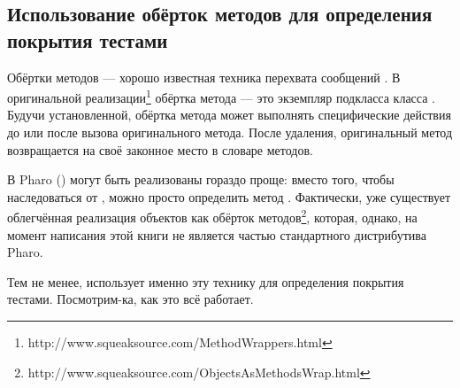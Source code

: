 \documentclass[a4paper,10pt,twoside]{book}
\begin{document}
\subsection{Использование обёрток методов для определения покрытия тестами}

Обёртки методов --- хорошо известная техника перехвата сообщений \cite{Bran98a}.
В оригинальной реализации\footnote{http://www.squeaksource.com/MethodWrappers.html} обёртка метода --- это экземпляр подкласса класса . Будучи установленной, обёртка метода может выполнять специфические действия до или после вызова оригинального метода.
После удаления, оригинальный метод возвращается на своё законное место в словаре методов.

В Pharo  () могут быть реализованы гораздо проще: вместо того, чтобы наследоваться от , можно просто определить метод . Фактически, уже существует облегчённая реализация объектов как обёрток методов\footnote{http://www.squeaksource.com/ObjectsAsMethodsWrap.html}, которая, однако, на момент написания этой книги не является частью стандартного дистрибутива Pharo.

Тем не менее,  использует именно эту технику для определения покрытия тестами.
Посмотрим-ка, как это всё работает.
\end{document}
